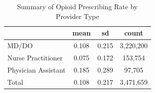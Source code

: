 \begin{table}[htbp]\centering
\def\sym#1{\ifmmode^{#1}\else\(^{#1}\)\fi}
\caption{Summary of Opioid Prescribing Rate by Provider Type}
\begin{tabular}{l*{1}{ccc}}
\toprule
                    &        mean&          sd&       count\\
\midrule
MD/DO               &       0.108&       0.215&   3,220,200\\
Nurse Practitioner  &       0.075&       0.172&     153,754\\
Physician Assistant &       0.185&       0.289&      97,705\\
Total               &       0.108&       0.217&   3,471,659\\
\bottomrule
\end{tabular}
\end{table}
